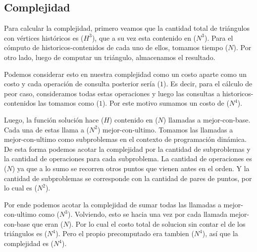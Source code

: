 \subsection{Complejidad}
\par{Para calcular la complejidad, primero veamos que la cantidad total de triángulos con vértices históricos es \bigo($H^3$), que a su vez esta contenido en \bigo($N^3$). Para el cómputo de historicos-contenidos de cada uno de ellos, tomamos tiempo \bigo($N$). Por otro lado, luego de computar un triángulo, almacenamos el resultado. } \newline
\par{
Podemos considerar esto en nuestra complejidad como un costo aparte como un costo  y cada operación de consulta posterior sería \bigo($1$). Es decir, para el cálculo de peor caso, consideramos todas estas operaciones y luego las consultas a historicos-contenidos las tomamos como \bigo($1$). Por este motivo sumamos un costo de \bigo($N^4$).} \newline
\par{
Luego, la función solución hace \bigo($H$) contenido en \bigo($N$) llamadas a mejor-con-base.
Cada una de estas llama a \bigo($N^2$) mejor-con-ultimo. Tomamos las llamadas a mejor-con-ultimo como subproblemas en el contexto de programación dinámica. De esta forma podemos acotar la complejidad por la cantidad de subproblemas y la cantidad de operaciones para cada subproblema. La cantidad de operaciones es \bigo($N$) ya que a lo sumo se recorren otros puntos que vienen antes en el orden. Y la cantidad de subproblemas se corresponde con la cantidad de pares de puntos, por lo cual es \bigo($N^2$).} \newline
\par{Por ende podemos acotar la complejidad de sumar todas las llamadas a mejor-con-ultimo como \bigo($N^3$). Volviendo, esto se hacia una vez por cada llamada mejor-con-base que eran \bigo($N$). Por lo cual el costo total de solucion sin contar el  de los triángulos es \bigo($N^4$). Pero el propio precomputado era tambien \bigo($N^4$), así que la complejidad es \bigo($N^4$).} \newline